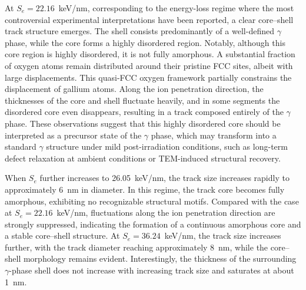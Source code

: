 \documentclass[%
reprint,
superscriptaddress,
 amsmath,amssymb,
 aps,
]{revtex4-2}
\begin{document}
At $S_e = 22.16$~keV/nm, corresponding to the energy-loss regime where the most
controversial experimental interpretations have been reported, a clear core--shell
track structure emerges.
The shell consists predominantly of a well-defined $\gamma$ phase, while the core
forms a highly disordered region.
Notably, although this core region is highly disordered, it is not fully amorphous.
A substantial fraction of oxygen atoms remain distributed around their pristine
FCC sites, albeit with large displacements.
This quasi-FCC oxygen framework partially constrains the displacement of gallium atoms.
Along the ion penetration direction, the thicknesses of the core and shell
fluctuate heavily, and in some segments the disordered core even disappears, resulting in
a track composed entirely of the $\gamma$ phase.
These observations suggest that this highly disordered core should be interpreted
as a precursor state of the $\gamma$ phase, which may transform into a standard 
$\gamma$ structure under mild post-irradiation conditions, such as
long-term defect relaxation at ambient conditions or TEM-induced structural recovery.

When $S_e$ further increases to 26.05~keV/nm, the track size increases rapidly to 
approximately 6~nm in diameter.
In this regime, the track core becomes fully amorphous, exhibiting no recognizable
structural motifs.
Compared with the case at $S_e = 22.16$~keV/nm, fluctuations along the ion penetration
direction are strongly suppressed, indicating the formation of a continuous amorphous
core and a stable core--shell structure.
At $S_e = 36.24$~keV/nm, the track size increases further, with the track diameter
reaching approximately 8~nm, while the core--shell morphology remains evident.
Interestingly, the thickness of the surrounding $\gamma$-phase shell does not
increase with increasing track size and saturates at about 1~nm.
\end{document}
